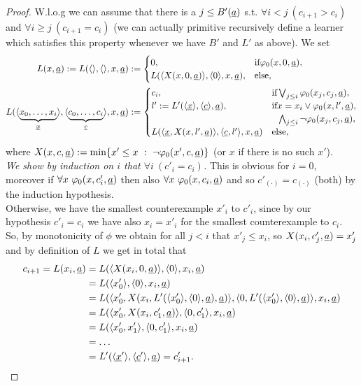 \begin{proof}
W.l.o.g we can assume that there is a $j\leq B'(\underline a)$ s.t. $\forall i<j\ (c_{i+1}>c_i)$ and $\forall i\geq j\ (c_{i+1}=c_i)$ (we can actually primitive recursively define a learner which satisfies this property whenever we have $B'$ and $L'$ as above). We set
\begin{align*}
L(x, \tup a):=L(\langle\rangle,\langle\rangle,x, \tup a)&:=\begin{cases}
0,&\Tif \phi_0(x,0,\tup a),\\
L( \langle X(x,0,\tup a)\rangle,\langle0\rangle,x,\tup a),&\Telse,\end{cases}\\
L(\langle \underbrace{x_0,\ldots,x_i}_{\tup x}\rangle, \langle \underbrace{c_0,\ldots,c_i}_{\tup c}\rangle,x,\tup a)&:=\begin{cases}
c_i,&\Tif \bigvee_{j\leq i}\phi_0(x_j,c_j,\tup a),\\
l':=L'(\langle {\tup x}\rangle, \langle {\tup c}\rangle,\tup a),&\Tif x=x_i\vee \phi_0(x,l',\tup a),\\
&\phantom{\Tif} \bigwedge_{j\leq i}\neg\phi_0(x_j,c_j,\tup a),\\
L( \langle {\tup x},X(x,l',\tup a)\rangle,
\langle \tup c,l'\rangle,x,\tup a) &\Telse,
\end{cases}\\
\end{align*}
where $X(x,c,\underline a):=\min\{x'\leq x\ :\ \neg \varphi_0(x',c,\underline a)\}$ (or $x$ if there is no such $x'$).\\
{\em We show by induction on $i$ that $\forall i\ (c'_i = c_i)$.} This is obvious for $i=0$, moreover 
if $\forall x\ \varphi_0(x,c'_{i},\underline a)$ then also $\forall x\ \phi_0(x,c_{i},\tup a)$ and so $c'_{(\cdot)}=c_{(\cdot)}$ (both) by the induction hypothesis.\\ Otherwise, we have the smallest counterexample $x'_i$ to $c'_i$, since by our hypothesis $c'_i=c_i$ we have also $x_i=x'_i$ for the smallest counterexample to $c_i$. 
So, by monotonicity of $\phi$ we obtain for all $j<i$ that $x'_j\leq x_i$, so $X(x_i,c'_j,\underline a)=x'_j$ and by definition of $L$ we get in total that 
\begin{align*}
c_{i+1}=L(x_i,\underline a)&=L(\langle X(x_i,0,\underline a)\rangle,\langle0\rangle,x_i,\underline a)\\
&=L(\langle x'_0\rangle,\langle0\rangle,x_i,\underline a)\\
&=L(\langle x'_0,  X(x_i,   L'(\langle x'_0\rangle,\langle0\rangle,\underline a)    ,\underline a)\rangle,\langle0, 
     L'(\langle x'_0\rangle,\langle0\rangle,\underline a)  \rangle,x_i,\underline a)\\
&=L(\langle x'_0,  X(x_i,   c'_1    ,\underline a)\rangle,\langle0, 
     c'_1  \rangle,x_i,\underline a)\\
&=L(\langle x'_0,  x'_1\rangle,\langle0, 
     c'_1  \rangle,x_i,\underline a)\\
&=\ldots\\
&=L'(\langle\underline x'\rangle,\langle\underline c'\rangle, \underline a)=c'_{i+1}.
\end{align*}


\end{proof}

